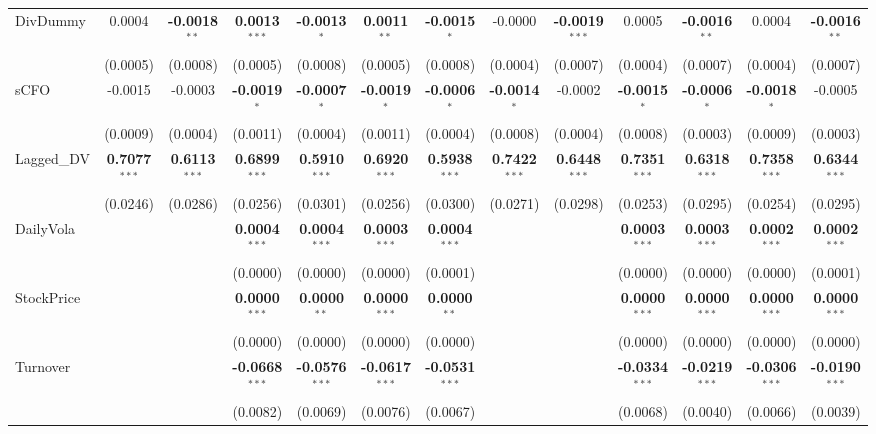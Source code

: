 \documentclass[11pt,a4paper]{article}
\begin{document}
\begin{table}[htbp]
\begin{tabular}{lcccccccccccc}
DivDummy & 0.0004 & \textbf{-0.0018}$^{**}$ & \textbf{0.0013}$^{***}$ & \textbf{-0.0013}$^{*}$ & \textbf{0.0011}$^{**}$ & \textbf{-0.0015}$^{*}$ & -0.0000 & \textbf{-0.0019}$^{***}$ & 0.0005 & \textbf{-0.0016}$^{**}$ & 0.0004 & \textbf{-0.0016}$^{**}$ \\
 & (0.0005) & (0.0008) & (0.0005) & (0.0008) & (0.0005) & (0.0008) & (0.0004) & (0.0007) & (0.0004) & (0.0007) & (0.0004) & (0.0007) \\
sCFO & -0.0015 & -0.0003 & \textbf{-0.0019}$^{*}$ & \textbf{-0.0007}$^{*}$ & \textbf{-0.0019}$^{*}$ & \textbf{-0.0006}$^{*}$ & \textbf{-0.0014}$^{*}$ & -0.0002 & \textbf{-0.0015}$^{*}$ & \textbf{-0.0006}$^{*}$ & \textbf{-0.0018}$^{*}$ & -0.0005 \\
 & (0.0009) & (0.0004) & (0.0011) & (0.0004) & (0.0011) & (0.0004) & (0.0008) & (0.0004) & (0.0008) & (0.0003) & (0.0009) & (0.0003) \\
Lagged\_DV & \textbf{0.7077}$^{***}$ & \textbf{0.6113}$^{***}$ & \textbf{0.6899}$^{***}$ & \textbf{0.5910}$^{***}$ & \textbf{0.6920}$^{***}$ & \textbf{0.5938}$^{***}$ & \textbf{0.7422}$^{***}$ & \textbf{0.6448}$^{***}$ & \textbf{0.7351}$^{***}$ & \textbf{0.6318}$^{***}$ & \textbf{0.7358}$^{***}$ & \textbf{0.6344}$^{***}$ \\
 & (0.0246) & (0.0286) & (0.0256) & (0.0301) & (0.0256) & (0.0300) & (0.0271) & (0.0298) & (0.0253) & (0.0295) & (0.0254) & (0.0295) \\
DailyVola &  &  & \textbf{0.0004}$^{***}$ & \textbf{0.0004}$^{***}$ & \textbf{0.0003}$^{***}$ & \textbf{0.0004}$^{***}$ &  &  & \textbf{0.0003}$^{***}$ & \textbf{0.0003}$^{***}$ & \textbf{0.0002}$^{***}$ & \textbf{0.0002}$^{***}$ \\
 &  &  & (0.0000) & (0.0000) & (0.0000) & (0.0001) &  &  & (0.0000) & (0.0000) & (0.0000) & (0.0001) \\
StockPrice &  &  & \textbf{0.0000}$^{***}$ & \textbf{0.0000}$^{**}$ & \textbf{0.0000}$^{***}$ & \textbf{0.0000}$^{**}$ &  &  & \textbf{0.0000}$^{***}$ & \textbf{0.0000}$^{***}$ & \textbf{0.0000}$^{***}$ & \textbf{0.0000}$^{***}$ \\
 &  &  & (0.0000) & (0.0000) & (0.0000) & (0.0000) &  &  & (0.0000) & (0.0000) & (0.0000) & (0.0000) \\
Turnover &  &  & \textbf{-0.0668}$^{***}$ & \textbf{-0.0576}$^{***}$ & \textbf{-0.0617}$^{***}$ & \textbf{-0.0531}$^{***}$ &  &  & \textbf{-0.0334}$^{***}$ & \textbf{-0.0219}$^{***}$ & \textbf{-0.0306}$^{***}$ & \textbf{-0.0190}$^{***}$ \\
 &  &  & (0.0082) & (0.0069) & (0.0076) & (0.0067) &  &  & (0.0068) & (0.0040) & (0.0066) & (0.0039) \\

\end{tabular}
\end{table}
\end{document}
